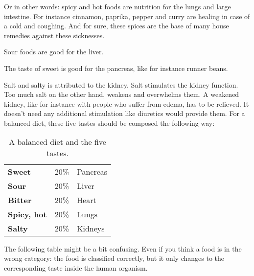 \documentclass[../main.tex]{subfiles}
\begin{document}
Or in other words: spicy and hot foods are nutrition for the lungs and large intestine.
For instance cinnamon, paprika, pepper and curry are healing in case of a cold and coughing.
And for sure, these spices are the base of many house remedies against these sicknesses.

Sour foods are good for the liver.

The taste of sweet is good for the pancreas, like for instance runner beans.

Salt and salty is attributed to the kidney. Salt stimulates the kidney function.
Too much salt on the other hand, weakens and overwhelms them.
A weakened kidney, like for instance with people who suffer from edema, has to be relieved.
It doesn't need any additional stimulation like diuretics would provide them.
For a balanced diet, these five tastes should be composed the following way:

\begin{table}[htb!]
  \begin{center}
  \caption{A balanced diet and the five tastes.}
\begin{tabular}{lll}
  \textbf{Sweet} & 20\% & Pancreas \\
  \textbf{Sour} & 20\% & Liver \\
  \textbf{Bitter} & 20\% & Heart \\
  \textbf{Spicy, hot} & 20\% & Lungs \\
  \textbf{Salty} & 20\% & Kidneys \\
\end{tabular}
  \end{center}
\end{table}

The following table might be a  bit confusing.
Even if you think a food is in the wrong category: the food is classified correctly,
but it only changes to the corresponding taste inside the human organism.
\end{document}
